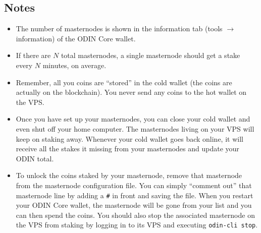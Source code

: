 \documentclass[rmp,12pt,notitlepage]{revtex4-1}
\begin{document}
\subsection{Notes}
\begin{itemize}[noitemsep]
   \item The number of masternodes is shown in the information tab (tools $\rightarrow$ information) of the ODIN Core wallet.  
   \item If there are $N$ total masternodes, a single masternode should get a stake every $N$ minutes, on average.
   \item Remember, all you coins are ``stored'' in the cold wallet (the coins are actually on the blockchain).  You never send any coins to the hot wallet on the VPS.
   \item Once you have set up your masternodes, you can close your cold wallet and even shut off your home computer.  The masternodes living on your VPS will keep on staking away.  Whenever your cold wallet goes back online, it will receive all the stakes it missing from your masternodes and update your ODIN total.  
   \item To unlock the coins staked by your masternode, remove that masternode from the masternode configuration file.  You can simply ``comment out'' that masternode line by adding a \verb|#| in front and saving the file.  When you restart your ODIN Core wallet, the masternode will be gone from your list and you can then spend the coins.  You should also stop the associated masternode on the VPS from staking by logging in to its VPS and executing \verb|odin-cli stop|.
\end{itemize}
\end{document}
